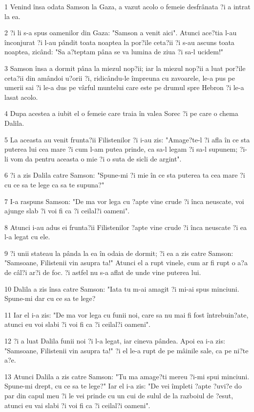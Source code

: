 \par 1 Venind însa odata Samson la Gaza, a vazut acolo o femeie desfrânata ?i a intrat la ea.
\par 2 ?i li s-a spus oamenilor din Gaza: "Samson a venit aici". Atunci ace?tia l-au înconjurat ?i l-au pândit toata noaptea la por?ile ceta?ii ?i s-au ascuns toata noaptea, zicând: "Sa a?teptam pâna se va lumina de ziua ?i sa-l ucidem!"
\par 3 Samson însa a dormit pâna la miezul nop?ii; iar la miezul nop?ii a luat por?ile ceta?ii din amândoi u?orii ?i, ridicându-le împreuna cu zavoarele, le-a pus pe umerii sai ?i le-a dus pe vârful muntelui care este pe drumul spre Hebron ?i le-a lasat acolo.
\par 4 Dupa acestea a iubit el o femeie care traia în valea Sorec ?i pe care o chema Dalila.
\par 5 La aceasta au venit frunta?ii Filistenilor ?i i-au zis: "Amage?te-l ?i afla în ce sta puterea lui cea mare ?i cum l-am putea prinde, ca sa-l legam ?i sa-l supunem; ?i-li vom da pentru aceasta o mie ?i o suta de sicli de argint".
\par 6 ?i a zis Dalila catre Samson: "Spune-mi ?i mie în ce sta puterea ta cea mare ?i cu ce sa te lege ca sa te supuna?"
\par 7 I-a raspuns Samson: "De ma vor lega cu ?apte vine crude ?i înca neuscate, voi ajunge slab ?i voi fi ca ?i ceilal?i oameni".
\par 8 Atunci i-au adus ei frunta?ii Filistenilor ?apte vine crude ?i înca neuscate ?i ea l-a legat cu ele.
\par 9 ?i unii stateau la pânda la ea în odaia de dormit; ?i ea a zis catre Samson: "Samsoane, Filistenii vin asupra ta!" Atunci el a rupt vinele, cum ar fi rupt o a?a de câl?i ar?i de foc. ?i astfel nu s-a aflat de unde vine puterea lui.
\par 10 Dalila a zis însa catre Samson: "Iata tu m-ai amagit ?i mi-ai spus minciuni. Spune-mi dar cu ce sa te lege?
\par 11 Iar el i-a zis: "De ma vor lega cu funii noi, care sa nu mai fi fost întrebuin?ate, atunci eu voi slabi ?i voi fi ca ?i ceilal?i oameni".
\par 12 ?i a luat Dalila funii noi ?i l-a legat, iar cineva pândea. Apoi ea i-a zis: "Samsoane, Filistenii vin asupra ta!" ?i el le-a rupt de pe mâinile sale, ca pe ni?te a?e.
\par 13 Atunci Dalila a zis catre Samson: "Tu ma amage?ti mereu ?i-mi spui minciuni. Spune-mi drept, cu ce sa te lege?" Iar el i-a zis: "De vei împleti ?apte ?uvi?e do par din capul meu ?i le vei prinde cu un cui de sulul de la razboiul de ?esut, atunci eu vai slabi ?i voi fi ca ?i ceilal?i oameni".
